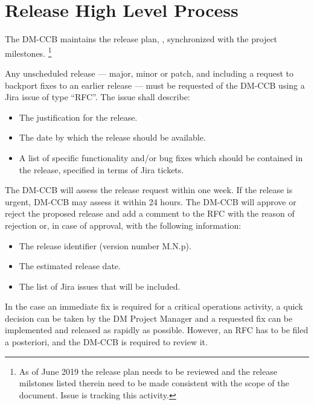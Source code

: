 \section{Release High Level Process} \label{sec:process}

The DM-CCB maintains the release plan, , synchronized with the project milestones.
\footnote{As of June 2019 the release plan needs to be reviewed and the release milstones listed therein need to be made consistent with the scope of the document.
Issue  is tracking this activity.}

Any unscheduled release --- major, minor or patch, and including a request to backport fixes to an earlier release --- must be requested of the DM-CCB using a Jira issue of type ``RFC''.
The issue shall describe:

\begin{itemize}
\item The justification for the release.
\item The date by which the release should be available.
\item A list of specific functionality and/or bug fixes which should be contained in the release, specified in terms of Jira tickets.
\end{itemize}

The DM-CCB will assess the release request within one week.
If the release is urgent, DM-CCB may assess it within 24 hours.
The DM-CCB will approve or reject the proposed release and add a comment to the RFC with the reason of rejection or, in case of approval, with the following information:

\begin{itemize}
\item The release identifier (version number M.N.p).
\item The estimated release date.
\item The list of Jira issues that will be included.
\end{itemize}

In the case an immediate fix is required for a critical operations activity, a quick decision can be taken by the DM Project Manager and a requested fix can be implemented and released as rapidly as possible.
However, an \gls{RFC} has to be filed a posteriori, and the DM-CCB is required to review it.
